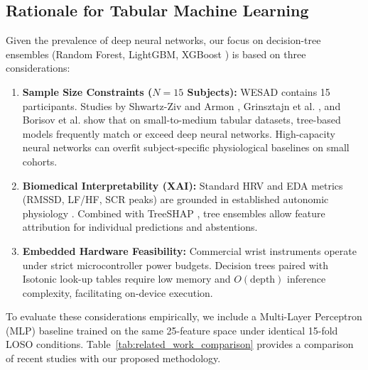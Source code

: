 \documentclass[conference]{IEEEtran}
\begin{document}
\subsection{Rationale for Tabular Machine Learning}
Given the prevalence of deep neural networks, our focus on decision-tree ensembles (Random Forest, LightGBM, XGBoost \cite{chen2016xgboost}) is based on three considerations:
\begin{enumerate}
    \item \textbf{Sample Size Constraints ($N=15$ Subjects):} WESAD contains 15 participants. Studies by Shwartz-Ziv and Armon \cite{shwartzziv2022tabular}, Grinsztajn et al. \cite{grinsztajn2022why}, and Borisov et al. \cite{borisov2024deep} show that on small-to-medium tabular datasets, tree-based models frequently match or exceed deep neural networks. High-capacity neural networks can overfit subject-specific physiological baselines on small cohorts.
    \item \textbf{Biomedical Interpretability (XAI):} Standard HRV and EDA metrics (RMSSD, LF/HF, SCR peaks) are grounded in established autonomic physiology \cite{taskforce1996heart, greco2016cvxeda, tarvainen2014kubios}. Combined with TreeSHAP \cite{lundberg2020local}, tree ensembles allow feature attribution for individual predictions and abstentions.
    \item \textbf{Embedded Hardware Feasibility:} Commercial wrist instruments operate under strict microcontroller power budgets. Decision trees paired with Isotonic look-up tables require low memory and $O(\text{depth})$ inference complexity, facilitating on-device execution.
\end{enumerate}

To evaluate these considerations empirically, we include a Multi-Layer Perceptron (MLP) baseline trained on the same 25-feature space under identical 15-fold LOSO conditions. Table~\ref{tab:related_work_comparison} provides a comparison of recent studies with our proposed methodology.
\end{document}
